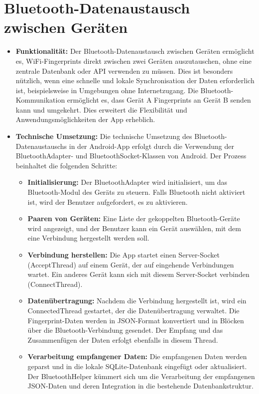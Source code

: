 \section{Bluetooth-Datenaustausch zwischen Geräten}
\begin{itemize}
    \item \textbf{Funktionalität:} Der Bluetooth-Datenaustausch zwischen Geräten ermöglicht es, WiFi-Fingerprints direkt zwischen zwei Geräten auszutauschen, ohne eine zentrale Datenbank oder API verwenden zu müssen. Dies ist besonders nützlich, wenn eine schnelle und lokale Synchronisation der Daten erforderlich ist, beispielsweise in Umgebungen ohne Internetzugang. Die Bluetooth-Kommunikation ermöglicht es, dass Gerät A Fingerprints an Gerät B senden kann und umgekehrt. Dies erweitert die Flexibilität und Anwendungsmöglichkeiten der App erheblich.

    \item \textbf{Technische Umsetzung:} Die technische Umsetzung des Bluetooth-Datenaustauschs in der Android-App erfolgt durch die Verwendung der BluetoothAdapter- und BluetoothSocket-Klassen von Android. Der Prozess beinhaltet die folgenden Schritte:
        \begin{itemize}
            \item \textbf{Initialisierung:} Der BluetoothAdapter wird initialisiert, um das Bluetooth-Modul des Geräts zu steuern. Falls Bluetooth nicht aktiviert ist, wird der Benutzer aufgefordert, es zu aktivieren.
            \item \textbf{Paaren von Geräten:} Eine Liste der gekoppelten Bluetooth-Geräte wird angezeigt, und der Benutzer kann ein Gerät auswählen, mit dem eine Verbindung hergestellt werden soll.
            \item \textbf{Verbindung herstellen:} Die App startet einen Server-Socket (AcceptThread) auf einem Gerät, der auf eingehende Verbindungen wartet. Ein anderes Gerät kann sich mit diesem Server-Socket verbinden (ConnectThread).
            \item \textbf{Datenübertragung:} Nachdem die Verbindung hergestellt ist, wird ein ConnectedThread gestartet, der die Datenübertragung verwaltet. Die Fingerprint-Daten werden in JSON-Format konvertiert und in Blöcken über die Bluetooth-Verbindung gesendet. Der Empfang und das Zusammenfügen der Daten erfolgt ebenfalls in diesem Thread.
            \item \textbf{Verarbeitung empfangener Daten:} Die empfangenen Daten werden geparst und in die lokale SQLite-Datenbank eingefügt oder aktualisiert. Der BluetoothHelper kümmert sich um die Verarbeitung der empfangenen JSON-Daten und deren Integration in die bestehende Datenbankstruktur.
        \end{itemize}


\end{itemize}
